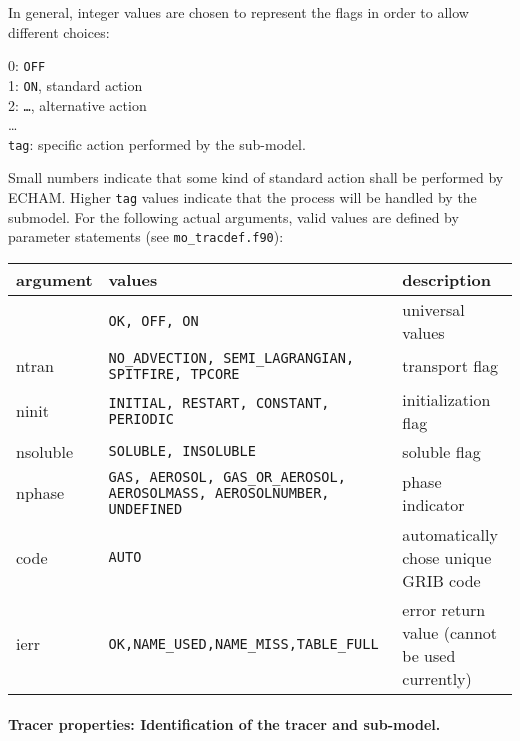 In general, integer values are chosen to represent the flags in order
to allow different choices:

\hspace*{2ex} 0: {\tt OFF}\\
\hspace*{2ex} 1: {\tt ON}, standard action\\
\hspace*{2ex} 2: {\tt\dots}, alternative action\\
\hspace*{2ex} \dots\\
\hspace*{2ex} {\tt tag}: specific action performed by the sub-model.

Small numbers indicate that some kind of standard action shall be
performed by ECHAM. Higher {\tt tag} values indicate that the process
will be handled by the submodel.
For the following actual arguments, valid values are defined by
parameter statements (see {\tt mo\_tracdef.f90}):

{\small
\begin{tabular*}{\textwidth}{|l@{\extracolsep\fill}p{10cm}p{4cm}|}
\hline
argument&values&description\\
\hline
        &{\tt OK, OFF, ON}                              & universal values\\
ntran   &{\tt NO\_ADVECTION, SEMI\_LAGRANGIAN, SPITFIRE, TPCORE}    & transport flag\\
ninit   &{\tt INITIAL, RESTART, CONSTANT, PERIODIC}            & initialization flag\\
nsoluble&{\tt SOLUBLE, INSOLUBLE}                   & soluble flag\\
nphase  &{\tt GAS, AEROSOL, GAS\_OR\_AEROSOL, AEROSOLMASS,
  AEROSOLNUMBER, UNDEFINED}                & phase indicator\\
code    &{\tt AUTO}                                & automatically
                                                     chose unique GRIB code\\
ierr    &{\tt OK,NAME\_USED,NAME\_MISS,TABLE\_FULL}& error return
value (cannot be used currently)\\
\hline
\end{tabular*}}

\paragraph{Tracer properties: Identification of the tracer and sub-model.}

